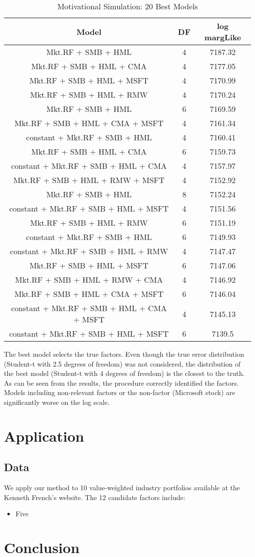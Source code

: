\documentclass[12pt]{article}
\begin{document}
\begin{table}[ht]
	
	\centering
	\footnotesize
	\begin{tabular}{ccc}
		\hline
		Model & DF & log margLike \\ 
		\hline
Mkt.RF + SMB + HML & 4 & 7187.32 \\ 
Mkt.RF + SMB + HML + CMA & 4 & 7177.05 \\ 
Mkt.RF + SMB + HML + MSFT & 4 & 7170.99 \\ 
Mkt.RF + SMB + HML + RMW & 4 & 7170.24 \\ 
Mkt.RF + SMB + HML & 6 & 7169.59 \\ 
Mkt.RF + SMB + HML + CMA + MSFT & 4 & 7161.34 \\ 
constant + Mkt.RF + SMB + HML & 4 & 7160.41 \\ 
Mkt.RF + SMB + HML + CMA & 6 & 7159.73 \\ 
constant + Mkt.RF + SMB + HML + CMA & 4 & 7157.97 \\ 
Mkt.RF + SMB + HML + RMW + MSFT & 4 & 7152.92 \\ 
Mkt.RF + SMB + HML & 8 & 7152.24 \\ 
constant + Mkt.RF + SMB + HML + MSFT & 4 & 7151.56 \\ 
Mkt.RF + SMB + HML + RMW & 6 & 7151.19 \\ 
constant + Mkt.RF + SMB + HML & 6 & 7149.93 \\ 
constant + Mkt.RF + SMB + HML + RMW & 4 & 7147.47 \\ 
Mkt.RF + SMB + HML + MSFT & 6 & 7147.06 \\ 
Mkt.RF + SMB + HML + RMW + CMA & 4 & 7146.92 \\ 
Mkt.RF + SMB + HML + CMA + MSFT & 6 & 7146.04 \\ 
constant + Mkt.RF + SMB + HML + CMA + MSFT & 4 & 7145.13 \\ 
constant + Mkt.RF + SMB + HML + MSFT & 6 & 7139.5 \\ 
		\hline
	\end{tabular}
	\caption{Motivational Simulation: 20 Best Models}
\end{table}

The best model selects the true factors. Even though the true error distribution (Student-t with 2.5 degrees of freedom) was not considered, the distribution of the best model (Student-t with 4 degrees of freedom) is the closest to the truth. \\
As can be seen from the results, the procedure correctly identified the factors. Models including non-relevant factors or the non-factor (Microsoft stock) are significantly worse on the log scale.
\section{Application}
\subsection{Data}
We apply our method to 10 value-weighted industry portfolios available at the Kenneth French's website. The 12 candidate factors include:
\begin{itemize}
	\item Five 
\end{itemize}

\section{Conclusion}

\end{document}
